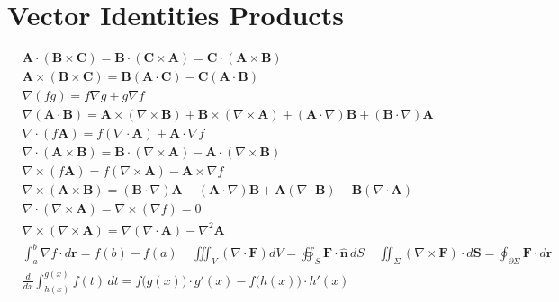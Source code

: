 \section*{Vector Identities Products}
\begin{align*}
&\mathbf{A} \cdot (\mathbf{B} \times \mathbf{C}) = \mathbf{B} \cdot (\mathbf{C} \times \mathbf{A}) = \mathbf{C} \cdot (\mathbf{A} \times \mathbf{B}) \\
&\mathbf{A} \times (\mathbf{B} \times \mathbf{C}) = \mathbf{B}(\mathbf{A} \cdot \mathbf{C}) - \mathbf{C}(\mathbf{A} \cdot \mathbf{B}) \\
&\nabla(fg) = f\nabla g + g\nabla f \\
&\nabla(\mathbf{A} \cdot \mathbf{B}) = \mathbf{A} \times (\nabla \times \mathbf{B}) + \mathbf{B} \times (\nabla \times \mathbf{A}) + (\mathbf{A} \cdot \nabla)\mathbf{B} + (\mathbf{B} \cdot \nabla)\mathbf{A} \\
&\nabla \cdot (f\mathbf{A}) = f(\nabla \cdot \mathbf{A}) + \mathbf{A} \cdot \nabla f \\
&\nabla \cdot (\mathbf{A} \times \mathbf{B}) = \mathbf{B} \cdot (\nabla \times \mathbf{A}) - \mathbf{A} \cdot (\nabla \times \mathbf{B}) \\
&\nabla \times (f\mathbf{A}) = f(\nabla \times \mathbf{A}) - \mathbf{A} \times \nabla f \\
&\nabla \times (\mathbf{A} \times \mathbf{B}) = (\mathbf{B} \cdot \nabla)\mathbf{A} - (\mathbf{A} \cdot \nabla)\mathbf{B} + \mathbf{A}(\nabla \cdot \mathbf{B}) - \mathbf{B}(\nabla \cdot \mathbf{A}) \\
&\nabla \cdot (\nabla \times \mathbf{A}) = \nabla \times (\nabla f) = 0 \\
&\nabla \times (\nabla \times \mathbf{A}) = \nabla (\nabla \cdot \mathbf{A}) - \nabla^2 \mathbf{A}\\
&\textstyle \int_a^b \nabla f \cdot d\mathbf{r} = f(b){-}f(a) \;\;\;\;
\iiint_V (\nabla{\cdot}\mathbf{F}) dV = \oiint_S \mathbf{F}{\cdot}\hat{\mathbf{n}}\,dS \;\;\;\;
\iint_\Sigma (\nabla{\times}\mathbf{F}){\cdot}d\mathbf{S} = \oint_{\partial\Sigma} \mathbf{F}{\cdot}d\mathbf{r}\\
&\tfrac{d}{dx}\textstyle \int_{h(x)}^{g(x)} f(t) \, dt =  f\big(g(x)\big) \cdot g'(x) - f\big(h(x)\big) \cdot h'(x)
\end{align*}
